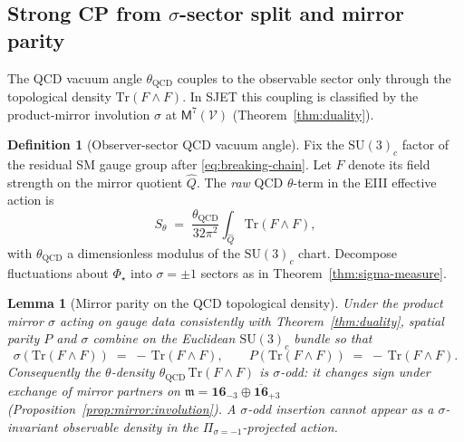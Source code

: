 \documentclass[11pt]{article}
\theoremstyle{plain}
\newtheorem{lemma}[theorem]{Lemma}
\theoremstyle{definition}
\newtheorem{definition}[theorem]{Definition}
\theoremstyle{remark}
\numberwithin{equation}{section}
\newcommand{\Void}{\mathcal{V}}
\newcommand{\Mirror}{\mathsf{M}}
\newcommand{\orderparam}{\Phi}
\begin{document}
\subsection{Strong CP from $\sigma$-sector split and mirror parity}
\label{sec:baryogenesis:strong-cp}

The QCD vacuum angle $\theta_{\mathrm{QCD}}$ couples to the observable sector
only through the topological density $\mathrm{Tr}(F\wedge F)$. In SJET this
coupling is classified by the product-mirror involution $\sigma$ at
$\Mirror^7(\Void)$ (Theorem~\ref{thm:duality}).

\begin{definition}[Observer-sector QCD vacuum angle]\label{def:theta-qcd}
Fix the $\mathrm{SU}(3)_c$ factor of the residual SM gauge group after
\eqref{eq:breaking-chain}. Let $F$ denote its field strength on the mirror
quotient $\hat Q$. The \emph{raw} QCD $\theta$-term in the EIII effective
action is
\begin{equation}\label{eq:theta-raw}
  S_\theta
  \;=\;
  \frac{\theta_{\mathrm{QCD}}}{32\pi^2}
  \int_{\hat Q}
  \mathrm{Tr}(F\wedge F),
\end{equation}
with $\theta_{\mathrm{QCD}}$ a dimensionless modulus of the
$\mathrm{SU}(3)_c$ chart. Decompose fluctuations about $\orderparam_\star$
into $\sigma=\pm1$ sectors as in Theorem~\ref{thm:sigma-measure}.
\end{definition}

\begin{lemma}[Mirror parity on the QCD topological density]
\label{lem:theta-parity}
Under the product mirror $\sigma$ acting on gauge data consistently with
Theorem~\ref{thm:duality}, spatial parity $P$ and $\sigma$ combine on the
Euclidean $\mathrm{SU}(3)_c$ bundle so that
\begin{equation}\label{eq:theta-sigma-odd}
  \sigma\!\left(\mathrm{Tr}(F\wedge F)\right)
  \;=\;
  -\,\mathrm{Tr}(F\wedge F),
  \qquad
  P\!\left(\mathrm{Tr}(F\wedge F)\right)
  \;=\;
  -\,\mathrm{Tr}(F\wedge F).
\end{equation}
Consequently the $\theta$-density $\theta_{\mathrm{QCD}}\,
\mathrm{Tr}(F\wedge F)$ is $\sigma$-odd: it changes sign under exchange of
mirror partners on $\mathfrak{m}=\mathbf{16}_{-3}\oplus\overline{\mathbf{16}}_{+3}$
(Proposition~\ref{prop:mirror:involution}). A $\sigma$-odd insertion cannot
appear as a $\sigma$-invariant observable density in the
$\Pi_{\sigma=-1}$-projected action.
\end{lemma}
\end{document}
